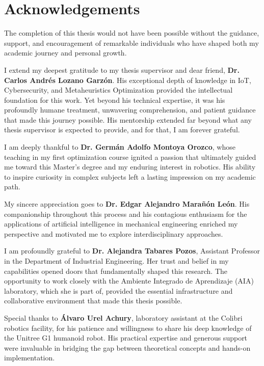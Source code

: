 \documentclass[12pt,a4paper]{article}
\begin{document}
\newpage

\medskip

\section*{Acknowledgements}

The completion of this thesis would not have been possible without the guidance, support, and encouragement of remarkable individuals who have shaped both my academic journey and personal growth.


I extend my deepest gratitude to my thesis supervisor and dear friend, \textbf{Dr. Carlos Andrés Lozano Garzón}. His exceptional depth of knowledge in IoT, Cybersecurity, and Metaheuristics Optimization provided the intellectual foundation for this work. Yet beyond his technical expertise, it was his profoundly humane treatment, unwavering comprehension, and patient guidance that made this journey possible. His mentorship extended far beyond what any thesis supervisor is expected to provide, and for that, I am forever grateful.

I am deeply thankful to \textbf{Dr. Germán Adolfo Montoya Orozco}, whose teaching in my first optimization course ignited a passion that ultimately guided me toward this Master's degree and my enduring interest in robotics. His ability to inspire curiosity in complex subjects left a lasting impression on my academic path.

My sincere appreciation goes to \textbf{Dr. Edgar Alejandro Marañón León}. His companionship throughout this process and his contagious enthusiasm for the applications of artificial intelligence in mechanical engineering enriched my perspective and motivated me to explore interdisciplinary approaches.

I am profoundly grateful to \textbf{Dr. Alejandra Tabares Pozos}, Assistant Professor in the Department of Industrial Engineering. Her trust and belief in my capabilities opened doors that fundamentally shaped this research. The opportunity to work closely with the Ambiente Integrado de Aprendizaje (AIA) laboratory, which she is part of, provided the essential infrastructure and collaborative environment that made this thesis possible.

Special thanks to \textbf{Álvaro Urel Achury}, laboratory assistant at the Colibri robotics facility, for his patience and willingness to share his deep knowledge of the Unitree G1 humanoid robot. His practical expertise and generous support were invaluable in bridging the gap between theoretical concepts and hands-on implementation.
\end{document}
